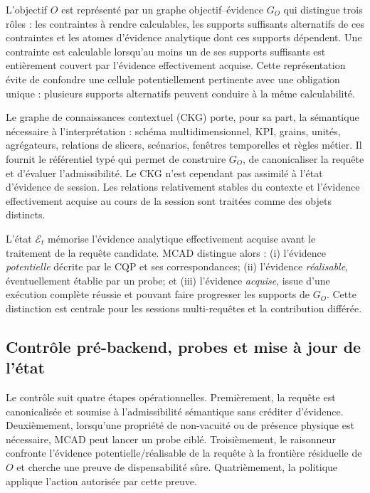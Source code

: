 \documentclass[journal]{IEEEtran}
\begin{document}
L'objectif $O$ est représenté par un graphe objectif--évidence $G_O$ qui distingue trois rôles : les contraintes à rendre calculables, les supports suffisants alternatifs de ces contraintes et les atomes d'évidence analytique dont ces supports dépendent. Une contrainte est calculable lorsqu'au moins un de ses supports suffisants est entièrement couvert par l'évidence effectivement acquise. Cette représentation évite de confondre une cellule potentiellement pertinente avec une obligation unique : plusieurs supports alternatifs peuvent conduire à la même calculabilité.

Le graphe de connaissances contextuel (CKG) porte, pour sa part, la sémantique nécessaire à l'interprétation : schéma multidimensionnel, KPI, grains, unités, agrégateurs, relations de slicers, scénarios, fenêtres temporelles et règles métier. Il fournit le référentiel typé qui permet de construire $G_O$, de canonicaliser la requête et d'évaluer l'admissibilité. Le CKG n'est cependant pas assimilé à l'état d'évidence de session. Les relations relativement stables du contexte et l'évidence effectivement acquise au cours de la session sont traitées comme des objets distincts.

L'état $\mathcal{E}_t$ mémorise l'évidence analytique effectivement acquise avant le traitement de la requête candidate. MCAD distingue alors : (i) l'évidence \emph{potentielle} décrite par le CQP et ses correspondances; (ii) l'évidence \emph{réalisable}, éventuellement établie par un probe; et (iii) l'évidence \emph{acquise}, issue d'une exécution complète réussie et pouvant faire progresser les supports de $G_O$. Cette distinction est centrale pour les sessions multi-requêtes et la contribution différée.

\subsection{Contrôle pré-backend, probes et mise à jour de l'état}

Le contrôle suit quatre étapes opérationnelles. Premièrement, la requête est canonicalisée et soumise à l'admissibilité sémantique sans créditer d'évidence. Deuxièmement, lorsqu'une propriété de non-vacuité ou de présence physique est nécessaire, MCAD peut lancer un probe ciblé. Troisièmement, le raisonneur confronte l'évidence potentielle/réalisable de la requête à la frontière résiduelle de $O$ et cherche une preuve de dispensabilité sûre. Quatrièmement, la politique applique l'action autorisée par cette preuve.
\end{document}
